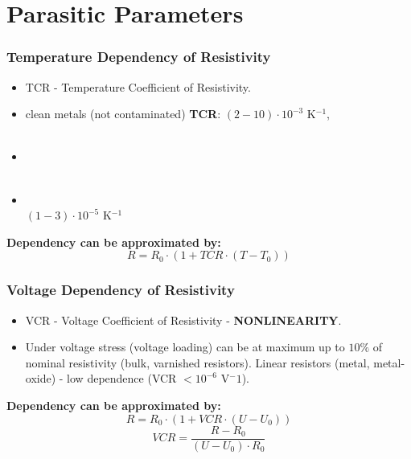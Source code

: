 \documentclass{beamer}
\begin{document}
\section{\texorpdfstring{Parasitic Parameters}{Parasitic Parameters}}
	\begin{frame}
    \frametitle{Temperature Dependency of Resistivity}
		\begin{itemize}
			\item TCR - Temperature Coefficient of Resistivity. 
			\item clean metals (not contaminated) \textbf{TCR}: $(2-10)\cdot 10^{-3}$ K$^{-1}$, \\ \color{blue}{($Fe - 10$; $W$, $Mo - 5.5$; $Cu - 4$; $Pt - 3.8$)}\\
			\item {}\\ \\
			\item {}\\ $(1-3)\cdot 10^{-5}$ K$^{-1}$\color{blue}{(Manganin, Constantan)}
		\end{itemize}
		\textbf{Dependency can be approximated by:}
		$$R = R_0\cdot \left(1+TCR\cdot \left(T-T_0\right)\right)$$
  \end{frame}
	\begin{frame}
    \frametitle{Voltage Dependency of Resistivity}
		\begin{itemize}
			\item VCR - Voltage Coefficient of Resistivity - \textbf{NONLINEARITY}. 
			\item Under voltage stress (voltage loading) can be at maximum up to $10\%$ of nominal resistivity (bulk, varnished resistors). Linear resistors (metal, metal-oxide) - low dependence (VCR $< 10^{-6}$ V$^-1$).

		\end{itemize}
		\textbf{Dependency can be approximated by:}
		$$R = R_0\cdot \left(1+VCR\cdot \left(U-U_0\right)\right)$$
		$$VCR = \frac{R-R_0}{\left(U-U_0\right)\cdot R_0}$$
  \end{frame}
\end{document}
